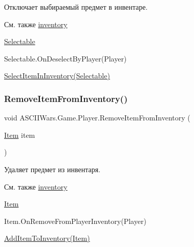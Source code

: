 Отключает выбираемый предмет в инвентаре. 

\begin{DoxySeeAlso}{См. также}
\hyperlink{class_a_s_c_i_i_wars_1_1_game_1_1_player_a04acfaa196162f89bfae7aee5ec45480}{inventory} 

\hyperlink{class_a_s_c_i_i_wars_1_1_game_1_1_selectable}{Selectable} 

Selectable.\+On\+Deselect\+By\+Player(\+Player) 

\hyperlink{class_a_s_c_i_i_wars_1_1_game_1_1_player_aec1c1f808fa3da1585a62487b0e92a38}{Select\+Item\+In\+Inventory(\+Selectable)} 
\end{DoxySeeAlso}
\hypertarget{class_a_s_c_i_i_wars_1_1_game_1_1_player_aa58a605f6337c385f4023ea842f6c246}{}\label{class_a_s_c_i_i_wars_1_1_game_1_1_player_aa58a605f6337c385f4023ea842f6c246} 
\subsubsection{\texorpdfstring{Remove\+Item\+From\+Inventory()}{RemoveItemFromInventory()}}
{\footnotesize\ttfamily void A\+S\+C\+I\+I\+Wars.\+Game.\+Player.\+Remove\+Item\+From\+Inventory (\begin{DoxyParamCaption}\item[{\hyperlink{class_a_s_c_i_i_wars_1_1_game_1_1_item}{Item}}]{item }\end{DoxyParamCaption})\hspace{0.3cm}{\ttfamily [inline]}}



Удаляет предмет из инвентаря. 

\begin{DoxySeeAlso}{См. также}
\hyperlink{class_a_s_c_i_i_wars_1_1_game_1_1_player_a04acfaa196162f89bfae7aee5ec45480}{inventory} 

\hyperlink{class_a_s_c_i_i_wars_1_1_game_1_1_item}{Item} 

Item.\+On\+Remove\+From\+Player\+Inventory(\+Player) 

\hyperlink{class_a_s_c_i_i_wars_1_1_game_1_1_player_a51054cd802e781a9f0a018f893ec3877}{Add\+Item\+To\+Inventory(\+Item)} 
\end{DoxySeeAlso}
\hypertarget{class_a_s_c_i_i_wars_1_1_game_1_1_player_aec1c1f808fa3da1585a62487b0e92a38}{}\label{class_a_s_c_i_i_wars_1_1_game_1_1_player_aec1c1f808fa3da1585a62487b0e92a38} 
